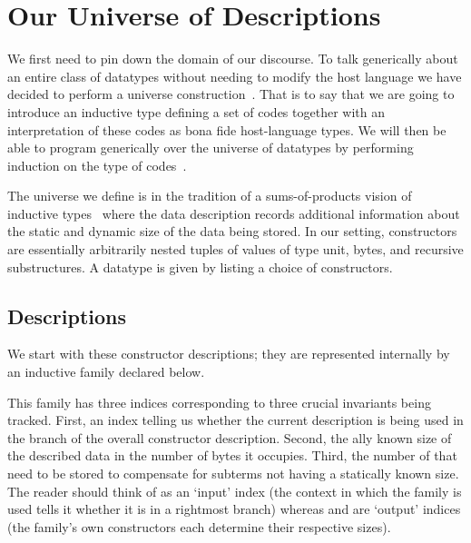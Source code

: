 \section{Our Universe of Descriptions}\label{sec:desc}

We first need to pin down the domain of our discourse.
%
To talk generically about an entire class of datatypes
without needing to modify the host language
we have decided to perform a universe
construction~\citep{benke-ugpp, DBLP:phd/ethos/Morris07, DBLP:conf/icfp/LohM11}.
%
That is to say that we are going to introduce an inductive type
defining a set of codes together
with an interpretation of these codes as bona fide
host-language types.
%
We will then be able to program generically over the universe of
datatypes by performing induction on the type of
codes~\citep{DBLP:conf/tphol/PfeiferR99}.

The universe we define is in the tradition of
a sums-of-products vision of inductive types~\citep{DBLP:conf/popl/JanssonJ97}
where the data description records additional information about
the static and dynamic size of the data being stored.
%
In our setting, constructors are essentially arbitrarily nested tuples of
values of type unit,
bytes,
and recursive substructures.
%
A datatype is given by listing a choice of constructors.

\subsection{Descriptions}

We start with these constructor descriptions;
they are represented internally by an inductive family 
declared below.


This family has three indices corresponding to three crucial
invariants being tracked.
%
First, an index telling us whether the current description
is being used in the  branch of the overall
constructor description.
%
Second, the ally known size of the described data
in the number of bytes it occupies.
%
Third, the number of  that need to be stored to
compensate for subterms not having a statically known size.
%
The reader should think of  as an `input' index
(the context in which the family is used tells it whether it is in
a rightmost branch)
whereas  and  are `output' indices
(the family's own constructors each determine their respective sizes).

